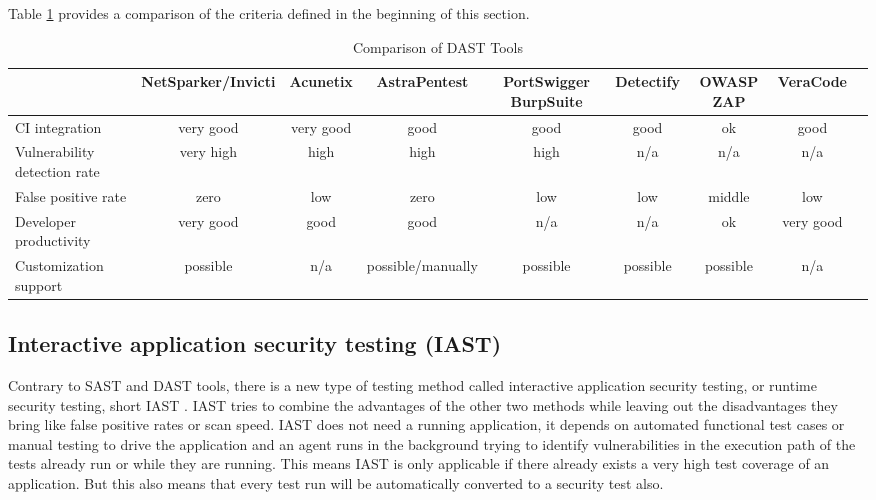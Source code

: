 \documentclass[conference]{IEEEtran}
\begin{document}
Table \ref{table:comparison_dast} provides a comparison of the criteria defined in the beginning of this section.


\begin{table}[h]
	\centering
	\scriptsize
	\caption{Comparison of DAST Tools}
	\begin{tabular}{l | c | c | c | c | c | c | c | c}
		\toprule
		\textbf{} & \textbf{NetSparker/Invicti}& \textbf{Acunetix} & \textbf{AstraPentest} & \textbf{PortSwigger BurpSuite} & \textbf{Detectify} & \textbf{OWASP ZAP} & \textbf{VeraCode}\\
		\hline
		\rowcolor[gray]{.9} CI integration    & very good & very good & good & good & good & ok & good \\
		Vulnerability detection rate   & very high & high  & high & high & n/a & n/a & n/a \\
		\rowcolor[gray]{.9} False positive rate & zero & low & zero & low & low & middle & low \\
		Developer productivity    & very good & good & good & n/a & n/a & ok & very good \\
		\rowcolor[gray]{.9} Customization support   &  possible   & n/a   & possible/manually  & possible & possible & possible & n/a \\
		\bottomrule
	\end{tabular}
	\label{table:comparison_dast}
\end{table}


\subsection{Interactive application security testing (IAST)}

Contrary to SAST and DAST tools, there is a new type of testing method called interactive application security testing, or runtime security testing, short IAST \cite[p.~140]{appsecbook}. IAST tries to combine the advantages of the other two methods while leaving out the disadvantages they bring like false positive rates or scan speed. IAST does not need a running application, it depends on automated functional test cases or manual testing to drive the application and an agent runs in the background trying to identify vulnerabilities in the execution path of the tests already run or while they are running. This means IAST is only applicable if there already exists a very high test coverage of an application. But this also means that every test run will be automatically converted to a security test also. 
\end{document}
